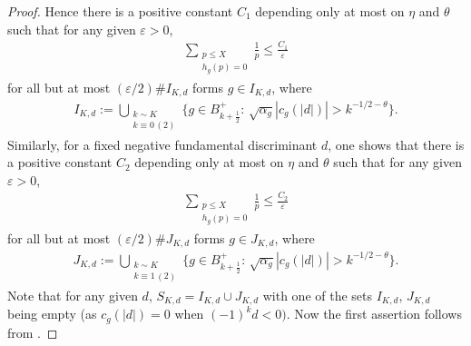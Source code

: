 \documentclass[10pt,a4paper]{amsart}
\begin{document}
\begin{proof}
Hence there is a positive constant $C_1$ depending only at most on $\eta$ and $\theta$ such that for any given $\varepsilon>0$,
\begin{align*}
\sum_{\substack{p\leq X \\
h_g(p)=0}}\frac1p\leq\frac {C_1}{\varepsilon}
\end{align*}
for all but at most $(\varepsilon/2)\# I_{K,d}$ forms $g\in I_{K,d}$, where
\begin{align*}
I_{K,d}:=\bigcup_{\substack{k\sim K\\
k\equiv 0\,(2)}}\{g\in B_{k+\frac12}^+:\,\sqrt{\alpha_g}|c_g(|d|)|>k^{-1/2-\theta}\}.
\end{align*}
Similarly, for a fixed negative fundamental discriminant $d$, one shows that there is a positive constant $C_2$ depending only at most on $\eta$ and $\theta$ such that for any given $\varepsilon>0$,
\begin{align*}
\sum_{\substack{p\leq X \\
h_g(p)=0}}\frac1p\leq\frac{C_2}{\varepsilon}
\end{align*}
for all but at most $(\varepsilon/2)\# J_{K,d}$ forms $g\in J_{K,d}$, where
\begin{align*}
J_{K,d}:=\bigcup_{\substack{k\sim K\\
k\equiv 1\,(2)}}\{g\in B_{k+\frac12}^+:\,\sqrt{\alpha_g}|c_g(|d|)|>k^{-1/2-\theta}\}.
\end{align*} 
Note that for any given $d$, $S_{K,d}=I_{K,d}\cup J_{K,d}$ with one of the sets $I_{K,d},\, J_{K,d}$ being empty (as $c_g(|d|)=0$ when $(-1)^kd<0)$. Now the first assertion follows from \cite[Theorem 2]{Hildebrand1987}. 


\end{proof}
\end{document}
